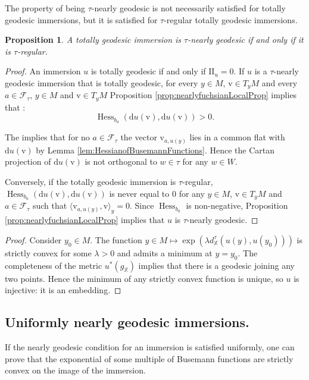 \documentclass[reqno,10pt]{amsart}
\theoremstyle{plain}
\newtheorem{prop}[thm]{Proposition}
\theoremstyle{definition}
\theoremstyle{remark}
\newcommand{\type}{\tau}
\DeclareMathOperator{\Hess}{Hess}
\newcommand{\II}{\mathrm{I\!I}}
\newcommand{\X}{\mathbb{X}}
\begin{document}
The property of being $\type$-nearly geodesic is not necessarily satisfied for totally geodesic immersions, but it is satisfied for $\type$-regular totally geodesic immersions.

\begin{prop}
\label{prop:TotGeodNearlyGeod}
A totally geodesic immersion is $\type$-nearly geodesic if and only if it is $\type$-regular.
\end{prop}

\begin{proof}

An immersion $u$ is totally geodesic if and only if $\II_u= 0$. If $u$ is a $\type$-nearly geodesic immersion that is totally geodesic, for every $y\in M$, $\mathrm{v}\in T_yM$ and every $a\in \mathcal{F}_\type$, $y\in M$ and $\mathrm{v}\in T_yM$ Proposition \ref{prop:nearlyfuchsianLocalProp} implies that :
$$\Hess_{b_a}(\mathrm{d}u(\mathrm{v}),\mathrm{d}u(\mathrm{v}))>0.$$


The implies that for no $a\in \mathcal{F}_\type$ the vector $\mathrm{v}_{a,u(y)}$ lies in a common flat with  $\mathrm{d}u(\mathrm{v})$ by Lemma \ref{lem:HessianofBusemannFunctions}. Hence the Cartan projection of $\mathrm{d}u(\mathrm{v})$ is not orthogonal to $w\in \type$ for any $w\in W$.

\medskip

Conversely, if the totally geodesic immersion is $\type$-regular, $\Hess_{b_a}(\mathrm{d}u(\mathrm{v}),\mathrm{d}u(\mathrm{v}))$ is never equal to $0$ for any $y\in M$, $\mathrm{v}\in T_yM$ and $a\in \mathcal{F}_\type$ such that $\langle \mathrm{v}_{a,u(y)},\mathrm{v}\rangle_y=0$. Since $\Hess_{b_a}$ is non-negative, Proposition \ref{prop:nearlyfuchsianLocalProp} implies that $u$ is $\type$-nearly geodesic.
\end{proof}

\begin{proof}
Consider $y_0\in M$. The function $y\in M\mapsto \exp\left(\lambda d^\type_\X(u(y),u(y_0))\right)$ is strictly convex for some $\lambda>0$ and admits a minimum at $y=y_0$. The completeness of the metric $u^*(g_\X)$ implies that there is a geodesic joining any two points. Hence the minimum of any strictly convex function is unique, so $u$ is injective: it is an embedding.
\end{proof}

\subsection{Uniformly nearly geodesic immersions.}
If the nearly geodesic condition for an immersion is satisfied uniformly, one can prove that the exponential of some multiple of Busemann functions are strictly convex on the image of the immersion. 
%
\end{document}
